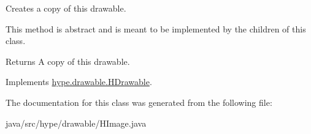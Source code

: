 Creates a copy of this drawable. 

This method is abstract and is meant to be implemented by the children of this class.

\begin{DoxyReturn}{Returns}
A copy of this drawable. 
\end{DoxyReturn}


Implements \hyperlink{classhype_1_1drawable_1_1_h_drawable_a9664f945675efa02d30228ca27d5819d}{hype.\-drawable.\-H\-Drawable}.



The documentation for this class was generated from the following file\-:\begin{DoxyCompactItemize}
\item 
java/src/hype/drawable/H\-Image.\-java\end{DoxyCompactItemize}
